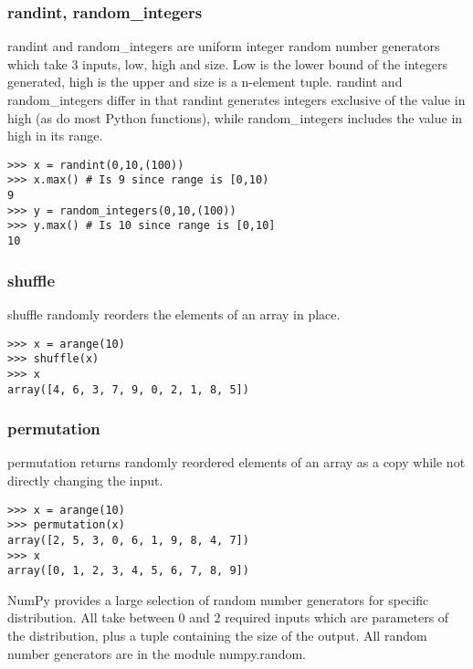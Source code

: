 \documentclass[KSmain.tex]{subfiles}
\begin{document}
\subsubsection{randint, random\_integers}
randint and random\_integers are uniform integer random number generators which take 3 inputs, low,
high and size. Low is the lower bound of the integers generated, high is the upper and size is a n-element
tuple. randint and random\_integers differ in that randint generates integers exclusive of the value in high
(as do most Python functions), while random\_integers includes the value in high in its range.
\begin{framed}
\begin{verbatim}
>>> x = randint(0,10,(100))
>>> x.max() # Is 9 since range is [0,10)
9
>>> y = random_integers(0,10,(100))
>>> y.max() # Is 10 since range is [0,10]
10
\end{verbatim}
\end{framed}
\subsubsection{shuffle}
shuffle randomly reorders the elements of an array in place.
\begin{framed}
\begin{verbatim}
>>> x = arange(10)
>>> shuffle(x)
>>> x
array([4, 6, 3, 7, 9, 0, 2, 1, 8, 5])
\end{verbatim}
\end{framed}
\subsubsection{permutation}
permutation returns randomly reordered elements of an array as a copy while not directly changing the
input.
\begin{framed}
\begin{verbatim}
>>> x = arange(10)
>>> permutation(x)
array([2, 5, 3, 0, 6, 1, 9, 8, 4, 7])
>>> x
array([0, 1, 2, 3, 4, 5, 6, 7, 8, 9])
\end{verbatim}
\end{framed}
NumPy provides a large selection of random number generators for specific distribution. All take between
0 and 2 required inputs which are parameters of the distribution, plus a tuple containing the size of the
output. All random number generators are in the module numpy.random.
%

\end{document}

